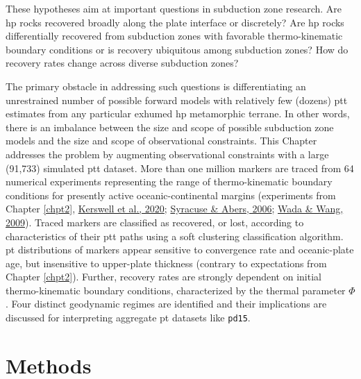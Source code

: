 These hypotheses aim at important questions in subduction zone research. Are \gls{hp} rocks recovered broadly along the plate interface or discretely? Are \gls{hp} rocks differentially recovered from subduction zones with favorable thermo-kinematic boundary conditions or is recovery ubiquitous among subduction zones? How do recovery rates change across diverse subduction zones?

The primary obstacle in addressing such questions is differentiating an unrestrained number of possible forward models with relatively few (dozens) \gls{ptt} estimates from any particular exhumed \gls{hp} metamorphic terrane. In other words, there is an imbalance between the size and scope of possible subduction zone models and the size and scope of observational constraints. This Chapter addresses the problem by augmenting observational constraints with a large (91,733) simulated \gls{ptt} dataset. More than one million markers are traced from 64 numerical experiments representing the range of thermo-kinematic boundary conditions for presently active oceanic-continental margins (experiments from Chapter \ref{chpt2}, \protect\hyperlink{ref-kerswell2020}{Kerswell et al., 2020}; \protect\hyperlink{ref-syracuse2006}{Syracuse \& Abers, 2006}; \protect\hyperlink{ref-wada2009}{Wada \& Wang, 2009}). Traced markers are classified as recovered, or lost, according to characteristics of their \gls{ptt} paths using a soft clustering classification algorithm. \gls{pt} distributions of markers appear sensitive to convergence rate and oceanic-plate age, but insensitive to upper-plate thickness (contrary to expectations from Chapter \ref{chpt2}). Further, recovery rates are strongly dependent on initial thermo-kinematic boundary conditions, characterized by the thermal parameter \(\Phi\). Four distinct geodynamic regimes are identified and their implications are discussed for interpreting aggregate \gls{pt} datasets like \texttt{pd15}.

\hypertarget{chpt4Methods}{%
\section{Methods}\label{chpt4Methods}}

